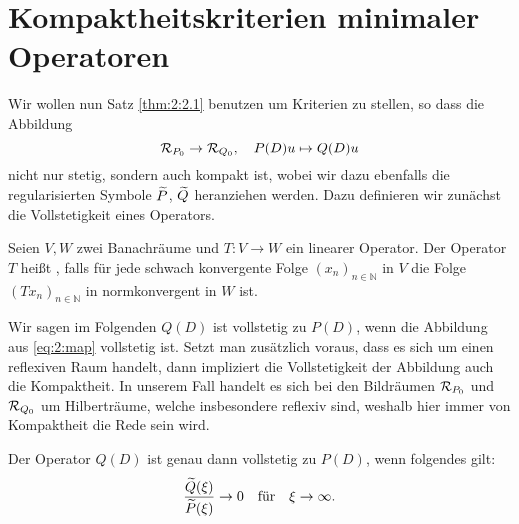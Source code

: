 \section{Kompaktheitskriterien minimaler Operatoren}
Wir wollen nun Satz \ref{thm:2:2.1} benutzen um Kriterien zu stellen, so dass die Abbildung
\begin{equation}\label{eq:2:map}
\mathcal R_{P_0}\to\mathcal R_{Q_0},\quad P(D)u\mapsto Q(D)u
\end{equation}
nicht nur stetig, sondern auch kompakt ist, wobei wir dazu ebenfalls die regularisierten Symbole $\widetilde{P}$, $\widetilde{Q}$ heranziehen werden. Dazu definieren wir zunächst die Vollstetigkeit eines Operators.
\begin{df}
Seien $V,W$ zwei Banachräume und $T: V \rightarrow W$ ein linearer Operator. Der Operator $T$ heißt , falls für jede schwach konvergente Folge $(x_n)_{n \in \mathbb{N}}$ in $V$ die Folge $(Tx_n)_{n \in \mathbb{N}}$ in normkonvergent in $W$ ist.
\end{df}
Wir sagen im Folgenden $Q(D)$ ist vollstetig zu $P(D)$, wenn die Abbildung aus \eqref{eq:2:map} vollstetig ist. Setzt man zusätzlich voraus, dass es sich um einen reflexiven Raum handelt, dann impliziert die Vollstetigkeit der Abbildung auch die Kompaktheit. In unserem Fall handelt es sich bei den Bildräumen $\mathcal R_{P_0}$ und $\mathcal R_{Q_0}$ um Hilberträume, welche insbesondere reflexiv sind, weshalb hier immer von Kompaktheit die Rede sein wird.
\begin{thm}\label{Abbildung kompakt}
Der Operator $Q(D)$ ist genau dann vollstetig zu $P(D)$,
wenn folgendes gilt:
\begin{equation}\label{eq:2:tozero}
\frac{\widetilde{Q}(\xi)}{\widetilde{P}(\xi)}\to0 \quad\text{für}\quad\xi\to\infty.
\end{equation}
\end{thm}
